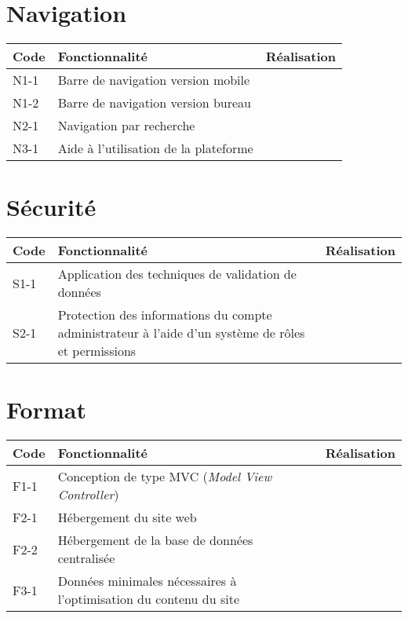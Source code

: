 \documentclass{scrreprt}
\begin{document}
\section{Navigation}
\begin{tabular}{|l|p{9cm}|r|}
 \hline
 \bfseries Code & \bfseries Fonctionnalité              & \bfseries Réalisation \\
 \hline
 N1-1           & Barre de navigation version mobile    &                       \\
 \hline
 N1-2           & Barre de navigation version bureau    &                       \\
 \hline
 N2-1           & Navigation par recherche              &                       \\
 \hline
 N3-1           & Aide à l'utilisation de la plateforme &                       \\
 \hline
\end{tabular}
\section{Sécurité}
\begin{tabular}{|l|p{9cm}|r|}
 \hline
 \bfseries Code & \bfseries Fonctionnalité                                                                           & \bfseries Réalisation \\
 \hline
 S1-1           & Application des techniques de validation de données                                                &                       \\
 \hline
 S2-1           & Protection des informations du compte administrateur à l'aide d'un système de rôles et permissions &                       \\
 \hline
\end{tabular}
\section{Format}
\begin{tabular}{|l|p{9cm}|r|}
 \hline
 \bfseries Code & \bfseries Fonctionnalité                                          & \bfseries Réalisation \\
 \hline
 F1-1           & Conception de type MVC (\textit{Model View Controller})           &                       \\
 \hline
 F2-1           & Hébergement du site web                                           &                       \\
 \hline
 F2-2           & Hébergement de la base de données centralisée                     &                       \\
 \hline
 F3-1           & Données minimales nécessaires à l'optimisation du contenu du site &                       \\
 \hline
\end{tabular}
\end{document}

